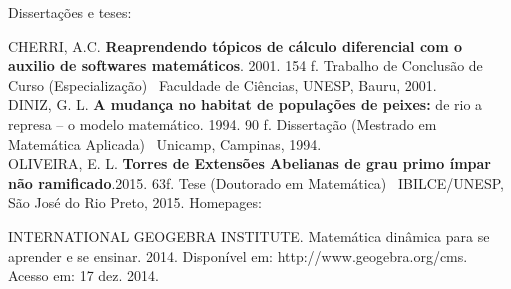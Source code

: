 \documentclass[a4paper,11pt]{article}
\begin{document}
\begin{flushleft}
\vskip 0.4cm
{\color{red}Dissertações e teses:}

CHERRI, A.C. \textbf{Reaprendendo tópicos de cálculo diferencial com o auxilio de softwares matemáticos}. 2001. 154 f. Trabalho de Conclusão de Curso (Especialização) \textendash\ Faculdade de Ciências, UNESP, Bauru, 2001.\\
\vskip 0.2cm
DINIZ, G. L. \textbf{A mudança no habitat de populações de peixes:} de rio a represa -- o modelo
matemático. 1994. 90 f. Dissertação (Mestrado em Matemática Aplicada) \textendash\ Unicamp, Campinas, 1994.\\
\vskip 0.2cm
OLIVEIRA, E. L. \textbf{Torres de Extensões Abelianas
de grau primo ímpar não ramificado}.2015. 63f. Tese (Doutorado em Matemática) \textendash\ IBILCE/UNESP, São José do Rio Preto, 2015.
\vskip 0.4cm
{\color{red}Homepages:}

INTERNATIONAL GEOGEBRA INSTITUTE. Matemática dinâmica para se aprender e se ensinar. 2014. Disponível em: http://www.geogebra.org/cms. Acesso em: 17 dez. 2014.
\end{flushleft}
\end{document}
